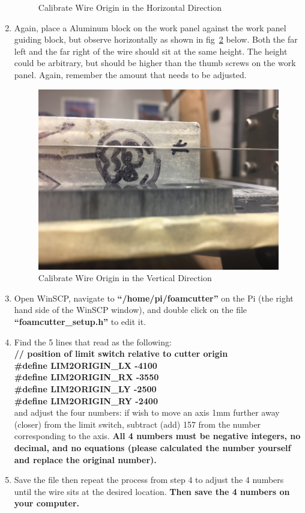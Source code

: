 \documentclass[titlepage,12pt,letter]{report}
\numberwithin{equation}{chapter}
\begin{document}
\begin{enumerate}[noitemsep,topsep=0pt]
\begin{figure} [H]
	\caption{Calibrate Wire Origin in the Horizontal Direction}
	\label{fig:zero1}
\end{figure}
\item Again, place a Aluminum block on the work panel against the work panel guiding block, but observe horizontally as shown in fig~\ref{fig:zero2} below. Both the far left and the far right of the wire should sit at the same height. The height could be arbitrary, but should be higher than the thumb screws on the work panel. Again, remember the amount that needs to be adjusted.
\begin{figure} [H]
	\includegraphics[width = 0.8\linewidth]{./Figures/zero_wire_2.jpg}
	\caption{Calibrate Wire Origin in the Vertical Direction}
	\label{fig:zero2}
\end{figure}
\item Open WinSCP, navigate to \textbf{``/home/pi/foamcutter''} on the Pi (the right hand side of the WinSCP window), and double click on the file \textbf{``foamcutter\_setup.h''} to edit it. 
\item Find the 5 lines that read as the following:\\
\textbf{// position of limit switch relative to cutter origin}\\
\textbf{\#define LIM2ORIGIN\_LX -4100}\\
\textbf{\#define LIM2ORIGIN\_RX -3550}\\
\textbf{\#define LIM2ORIGIN\_LY -2500}\\
\textbf{\#define LIM2ORIGIN\_RY -2400}\\
and adjust the four numbers: if wish to move an axis 1mm further away (closer) from the limit switch, subtract (add) 157 from the number corresponding to the axis. \textbf{All 4 numbers must be negative integers, no decimal, and no equations (please calculated the number yourself and replace the original number).}
\item Save the file then repeat the process from step 4 to adjust the 4 numbers until the wire sits at the desired location. \textbf{Then save the 4 numbers on your computer.}
\end{enumerate}
\end{document}
